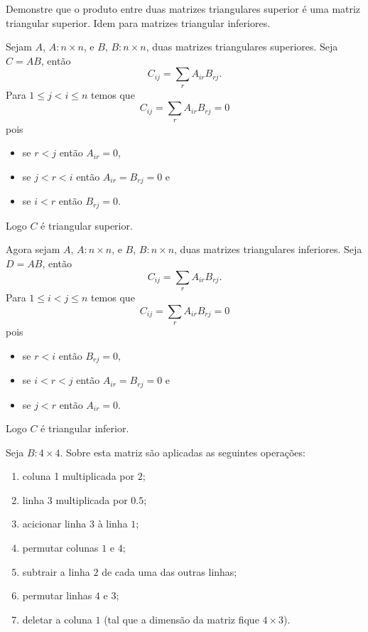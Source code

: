 \documentclass[a4paper,12pt, leqno, answers]{exam}
\begin{document}
\begin{questions}
    \question Demonstre que o produto entre duas matrizes triangulares superior \'{e} uma matriz triangular superior. Idem para matrizes triangular inferiores.
    \begin{solution}
        Sejam $A$, $A: n \times n$, e $B$, $B: n \times n$, duas matrizes triangulares superiores. Seja $C = A B$, ent\~{a}o
        \[
        C_{ij} = \sum_r A_{ir} B_{rj}.
        \]
        Para $1 \leq j < i \leq n$ temos que
        \[
        C_{ij} = \sum_r A_{ir} B_{rj} = 0
        \]
        pois
        \begin{itemize}
            \item se $r < j$ ent\~{a}o $A_{ir} = 0$,
            \item se $j < r < i$ ent\~{a}o $A_{ir} = B_{rj} = 0$ e
            \item se $i < r$ ent\~{a}o $B_{rj} = 0$.
        \end{itemize}
        Logo $C$ \'{e} triangular superior.
  
        Agora sejam $A$, $A: n \times n$, e $B$, $B: n \times n$, duas matrizes triangulares inferiores. Seja $D = A B$, ent\~{a}o
        \[
        C_{ij} = \sum_r A_{ir} B_{rj}.
        \]
        Para $1 \leq i < j \leq n$ temos que
        \[
        C_{ij} = \sum_r A_{ir} B_{rj} = 0
        \]
        pois
        \begin{itemize}
            \item se $r < i$ ent\~{a}o $B_{rj} = 0$,
            \item se $i < r < j$ ent\~{a}o $A_{ir} = B_{rj} = 0$ e
            \item se $j < r$ ent\~{a}o $A_{ir} = 0$.
        \end{itemize}
        Logo $C$ \'{e} triangular inferior.
    \end{solution}
  
     Seja $B : 4 \times 4$. Sobre esta matriz s\~{a}o aplicadas as seguintes opera\c{c}\~{o}es:
    \begin{enumerate}
        \item coluna 1 multiplicada por $2$;
        \item linha 3 multiplicada por $0.5$;
        \item acicionar linha $3$ \`{a} linha $1$;
        \item permutar colunas $1$ e $4$;
        \item subtrair a linha $2$ de cada uma das outras linhas;
        \item permutar linhas $4$ e $3$;
        \item deletar a coluna $1$ (tal que a dimens\~{a}o da matriz fique $4 \times 3$).
    \end{enumerate}
    \begin{parts}

\end{parts}
\end{questions}
\end{document}
